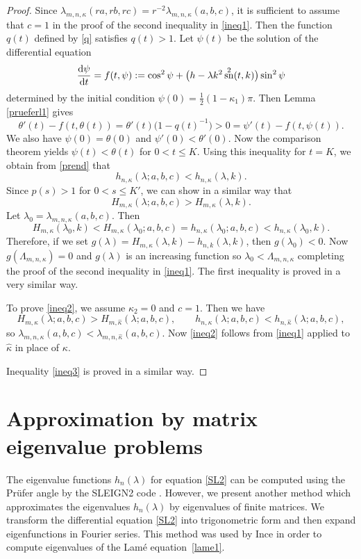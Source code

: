 \documentclass[10pt,a4paper]{amsart}
\newcommand{\RS}[1]{\textcolor{red}{#1}}
\DeclareMathOperator{\sn}{sn}
\numberwithin{equation}{section}
\begin{document}
\begin{proof}
Since $\lambda_{m,n,\kappa}(ra,rb,rc)=r^{-2} \lambda_{m,n,\kappa}(a,b,c)$, it is sufficient to assume that $c=1$
in the proof of the second inequality in \eqref{ineq1}.
Then the function $q(t)$ defined by \eqref{q} satisfies $q(t)>1$.
Let $\psi(t)$ be the solution of the differential equation
\begin{equation*}%
\frac{{\rm d}\psi}{{\rm d}t}= f(t,\psi):=\cos^2\psi+\bigl(h-\lambda k^2\sn^2(t,k)\bigr)\sin^2\psi
\end{equation*}
determined by the initial condition $\psi(0)=\frac12(1-\kappa_1)\pi$.
Then Lemma \ref{prueferl1} gives
\[\theta'(t)-f(t,\theta(t))=\theta'(t)\bigl(1-q(t)^{-1}\bigr)>0=\psi'(t)-f(t,\psi(t)).\]
We also have $\psi(0)=\theta(0)$ and $\psi'(0)<\theta'(0)$. Now the comparison theorem \RS{\cite[?????~II.9.III]{WW}} yields $\psi(t)<\theta(t)$
for $0<t\le K$.
Using this inequality for $t=K$, we obtain from \eqref{prend} that
\[ h_{n,\kappa}(\lambda;a,b,c)< h_{n,\kappa}(\lambda,k) .\]
Since $p(s)>1$ for $0<s\le K'$, we can show in a similar way that
\[ H_{m,\kappa}(\lambda;a,b,c)> H_{m,\kappa}(\lambda,k).\]
Let $\lambda_0=\lambda_{m,n,\kappa}(a,b,c)$. Then
\[ H_{m,\kappa}(\lambda_0,k)<H_{m,\kappa}(\lambda_0;a, b,c)=h_{n,\kappa}(\lambda_0;a,b,c)<h_{n,\kappa}(\lambda_0,k) .\]
Therefore, if we set $g(\lambda)=H_{m,\kappa}(\lambda,k)-h_{n,k}(\lambda,k)$, then $g(\lambda_0)<0$. Now $g(\Lambda_{m,n,\kappa})=0$ and $g(\lambda)$ is an increasing function so
$\lambda_0<\Lambda_{m,n,\kappa}$ completing the proof of the second inequality in \eqref{ineq1}.
The first inequality is proved in a very similar way.

To prove \eqref{ineq2}, we assume $\kappa_2=0$ and $c=1$. Then we have
\[ H_{m,\kappa}(\lambda;a,b,c)>H_{m,\hat\kappa}(\lambda;a,b,c),\qquad h_{n,\kappa}(\lambda;a,b,c)<h_{n,\hat\kappa}(\lambda;a,b,c),
\]
so $\lambda_{m,n,\kappa}(a,b,c)<\lambda_{m,n,\hat\kappa}(a,b,c)$.
Now \eqref{ineq2} follows from \eqref{ineq1} applied to $\hat\kappa$ in place of $\kappa$.

Inequality \eqref{ineq3} is proved in a similar way.
\end{proof}

\section{Approximation by matrix eigenvalue problems}\label{matrix}

The eigenvalue functions $h_n(\lambda)$ for equation \eqref{SL2} can be computed using the Pr\"ufer angle by the
SLEIGN2 code \cite{BEZ}. However, we present another method which approximates the eigenvalues $h_n(\lambda)$ by
eigenvalues of finite matrices.
We transform the differential equation \eqref{SL2} into trigonometric form and then expand
eigenfunctions in Fourier series.
This method was used by Ince \cite{I.FIP} in order to compute eigenvalues of the Lam\'e equation~\eqref{lame1}.
\end{document}
